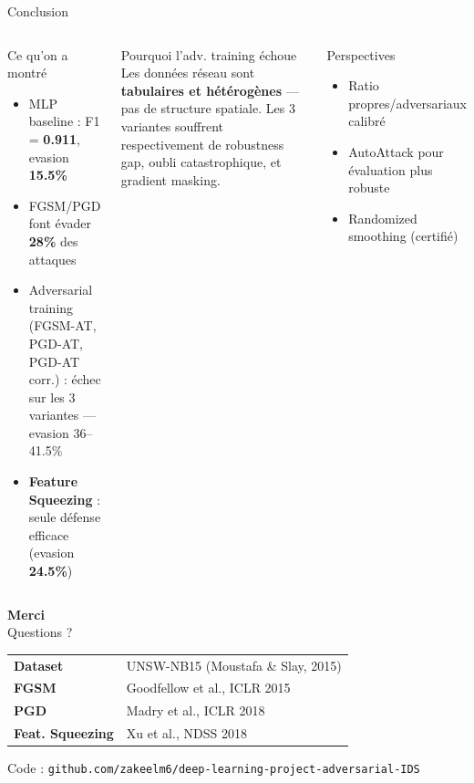 \documentclass[aspectratio=169,11pt]{beamer}
\begin{document}
\begin{frame}{Conclusion}
\begin{columns}[T]
\begin{block}{Ce qu'on a montr\'e}
\begin{itemize}
    \item MLP baseline : F1 = \textbf{0.911}, evasion \textbf{15.5\%}
    \item FGSM/PGD font \'evader \textbf{28\%} des attaques
    \item Adversarial training (FGSM-AT, PGD-AT, PGD-AT corr.) : \alert{\'echec sur les 3 variantes} --- evasion 36--41.5\%
    \item \textbf{Feature Squeezing} : seule d\'efense efficace (evasion \textbf{24.5\%})
\end{itemize}
\end{block}

\begin{alertblock}{Pourquoi l'adv. training \'echoue}
Les donn\'ees r\'eseau sont \textbf{tabulaires et h\'et\'erog\`enes} --- pas de structure spatiale.
Les 3 variantes souffrent respectivement de robustness gap, oubli catastrophique, et gradient masking.
\end{alertblock}

\vspace{0.3em}
\begin{exampleblock}{Perspectives}
\begin{itemize}
    \item Ratio propres/adversariaux calibr\'e
    \item AutoAttack pour \'evaluation plus robuste
    \item Randomized smoothing (certifi\'e)
\end{itemize}
\end{exampleblock}
\end{columns}
\end{frame}

\begin{frame}[plain]
\begin{center}
\vspace{2em}
{\LARGE\bfseries\color{myblue} Merci}\\[1em]
{\large Questions ?}\\[2em]
\begin{tabular}{ll}
\textbf{Dataset} & UNSW-NB15 (Moustafa \& Slay, 2015) \\
\textbf{FGSM}    & Goodfellow et al., ICLR 2015 \\
\textbf{PGD}     & Madry et al., ICLR 2018 \\
\textbf{Feat. Squeezing} & Xu et al., NDSS 2018 \\
\end{tabular}
\vspace{1.5em}

\footnotesize\color{gray}
Code : \texttt{github.com/zakeelm6/deep-learning-project-adversarial-IDS}
\end{center}
\end{frame}
\end{document}
